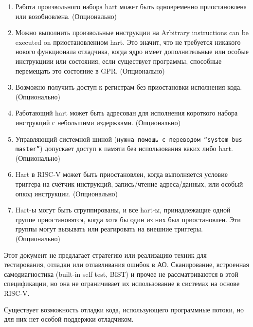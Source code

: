\begin{enumerate}
   \item Работа произвольного набора hart может быть одновременно приостановлена или
       возобновлена. (Опционально)
   \item Можно выполнить произвольные инструкции на
Arbitrary instructions can be executed on
       приостановленном hart. Это значит, что не требуется никакого нового функционала
       отладчика, когда ядро имеет дополнительные или особые инструкциии или состояния,
       если существует программы, способные перемещать это состояние в GPR. (Опционально)
   \item Возможно получить доступ к регистрам без приостановки исполнения кода. (Опционально)
   \item Работающий hart может быть адресован для исполнения короткого набора
       инструкций с небольшими издержками. (Опционально)
   \item Управляющий системной шиной ({\tt нужна помощь с переводом ``system bus master''}) допускает
       доступ к памяти без использования каких либо hart. (Опционально)
   \item Hart в RISC-V может быть приостановлен, когда выполняется условие триггера на
       счётчик инструкций, запись/чтение адреса/данных, или особый опкод инструкции. (Опционально)
    \item Hart-ы могут быть сгруппированы, и все hart-ы, принадлежащие одной группе приостановятся,
        когда хотя бы один из них был приостановлен. Эти группы могут вызывать или реагировать на
        внешние триггеры. (Опционально)
\end{enumerate}

Этот документ не предлагает стратегию или реализацию техник для тестирования, отладки или
отлавливания ошибок в АО. Сканирование, встроенная самодиагностика (built-in self test, BIST) и прочее
не рассматриваются в этой спецификации, но она не ограничивает их использование в системах на основе
RISC-V.

Существует возможность отладки кода, использующего программные потоки, но для них нет
особой поддержки отладчиком.
